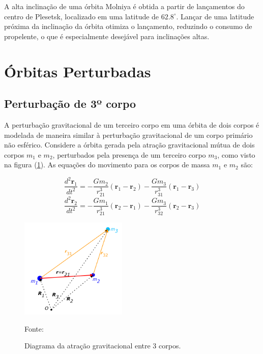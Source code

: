 \par A alta inclinação de uma órbita Molniya é obtida a partir de lançamentos do centro de Plesetsk, localizado em uma latitude de $62.8^\circ$. Lançar de uma latitude próxima da inclinação da órbita otimiza o lançamento, reduzindo o consumo de propelente, o que é especialmente desejável para inclinações altas.

\section{Órbitas Perturbadas}
\subsection{Perturbação de 3º corpo}

\par A perturbação gravitacional de um terceiro corpo em uma órbita de dois corpos é modelada de maneira similar à perturbação gravitacional de um corpo primário não esférico. Considere a órbita gerada pela atração gravitacional mútua de dois corpos $m_1$ e $m_2$, perturbados pela presença de um terceiro corpo $m_3$, como visto na figura (\ref{fig:3corpo}). As equações do movimento para os corpos de massa $m_1$ e $m_2$ são:

\begin{equation}
\frac{d^2\mathbf r_1}{dt^2}=-\frac{Gm_2}{r_{21}^3}\left(\mathbf r_1-\mathbf r_2\right)-\frac{Gm_3}{r_{31}^3}\left(\mathbf r_1-\mathbf r_3\right)   
\label{eq:1a12}
\end{equation}
\begin{equation}
\frac{d^2\mathbf r_2}{dt^2}=-\frac{Gm_1}{r_{21}^3}\left(\mathbf r_2-\mathbf r_1\right)-\frac{Gm_3}{r_{32}^3}\left(\mathbf r_2-\mathbf r_3\right)
\label{eq:2a12}
\end{equation}

\begin{figure}[h]
        \centering
        \includegraphics[width=2in]{figuras/3corpo.png}
        \caption{Diagrama da atração gravitacional entre 3 corpos.}
        \footnotesize Fonte: \cite{livro:andre}
        \label{fig:3corpo}
\end{figure} 

